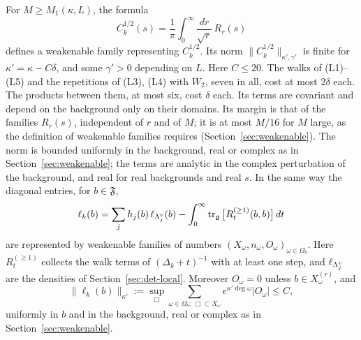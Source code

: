 \begin{corollary}\label{cor:weak-covariance}
For $M\ge M_1(\kappa,L)$, the formula
\[
C_k^{1/2}(s)=\frac1\pi\int_0^\infty\frac{dr}{\sqrt r}\,R_r(s)
\]
defines a weakenable family representing $C_k^{1/2}$. Its norm $\|C_k^{1/2}\|_{\kappa',\gamma'}$ is finite for $\kappa'=\kappa-C\delta$, and some $\gamma'>0$ depending on $L$. Here $C\le20$. The walks of (L1)--(L5) and the repetitions of (L3), (L4) with $W_2$, seven in all, cost at most $2\delta$ each. The products between them, at most six, cost $\delta$ each. Its terms are covariant and depend on the background only on their domains. Its margin is that of the families $R_r(s)$, independent of $r$ and of $M$; it is at most $M/16$ for $M$ large, as the definition of weakenable families requires (Section~\ref{sec:weakenable}). The norm is bounded uniformly in the background, real or complex as in Section~\ref{sec:weakenable}; the terms are analytic in the complex perturbation of the background, and real for real backgrounds and real $s$. In the same way the diagonal entries, for $b\in\mathfrak F$,
\[
\ell_k(b)=\sum_jh_j(b)\,\ell_{\Lambda^v_j}(b)-\int_0^\infty\operatorname{tr}_{\mathfrak g}\big[R^{(\ge1)}_t(b,b)\big]\,dt
\]
are represented by weakenable families of numbers $(X_\omega,n_\omega,O_\omega)_{\omega\in\Omega_b}$. Here $R^{(\ge1)}_t$ collects the walk terms of $(\Delta_k+t)^{-1}$ with at least one step, and $\ell_{\Lambda^v_j}$ are the densities of Section~\ref{sec:det-local}. Moreover $O_\omega=0$ unless $b\in X_\omega^{(r)}$, and
\[
\|\ell_k(b)\|_{\kappa'}:=\sup_\Box\sum_{\omega\in\Omega_b:\,\Box\subset X_\omega}e^{\kappa'\deg\omega}|O_\omega|\le C,
\]
uniformly in $b$ and in the background, real or complex as in Section~\ref{sec:weakenable}.
\end{corollary}

